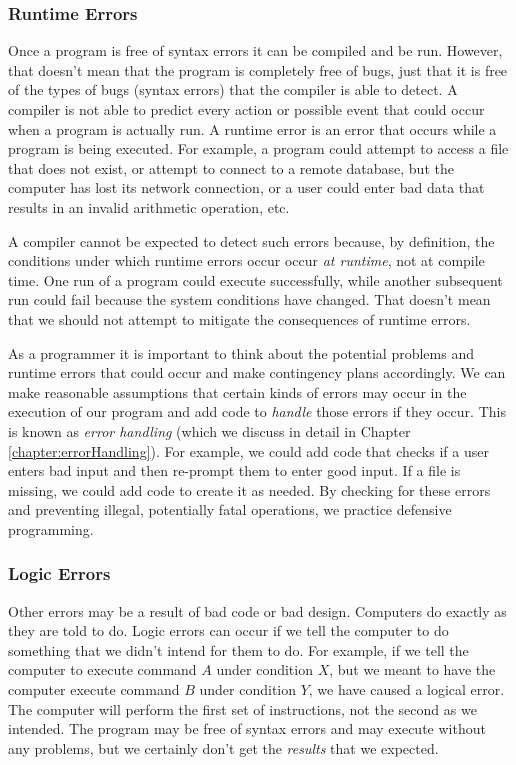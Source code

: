 \subsubsection{Runtime Errors}

Once a program is free of syntax errors it can be compiled and be run.  
However, that
doesn't mean that the program is completely free of bugs, just that it is free of
the types of bugs (syntax errors) that the compiler is able to detect.  A compiler
is not able to predict every action or possible event that could occur when a 
program is actually run.  A runtime error is an error that occurs while a program
is being executed.  For example, a program could attempt to access a file that
does not exist, or attempt to connect to a remote database, but the computer has lost
its network connection, or a user could enter bad data that results in an invalid
arithmetic operation, etc.

A compiler cannot be expected to detect such errors because, by definition, the 
conditions under which runtime errors occur occur \emph{at runtime}, not at 
compile time.  One run of a program could execute successfully, while another
subsequent run could fail because the system conditions have changed.  That
doesn't mean that we should not attempt to mitigate the consequences of runtime errors.

As a programmer it is important to think about the potential problems and
runtime errors that could occur and make contingency plans accordingly.
We can make reasonable assumptions that certain kinds of errors may 
occur in the execution of our program and add code to \emph{handle} 
those errors if they occur.  This is known as \emph{error handling} (which
we discuss in detail in Chapter \ref{chapter:errorHandling}).  For
example, we could add code that checks if a user enters bad input and
then re-prompt them to enter good input.  If a file is missing, we could add
code to create it as needed.  By checking for these errors and preventing
illegal, potentially fatal operations, we practice 
\gls{defensive programming}.

\subsubsection{Logic Errors}

Other errors may be a result of bad code or bad design.  Computers do 
exactly as they are told to do.  Logic errors can occur if we tell the
computer to do something that we didn't intend for them to do.  For example, 
if we tell the computer to execute command $A$ under condition $X$, but
we meant to have the computer execute command $B$ under condition $Y$, 
we have caused a logical error.  The computer will perform the first set of 
instructions, not the second as we intended.  The program may be free of
syntax errors and may execute without any problems, but we certainly don't
get the \emph{results} that we expected.  

